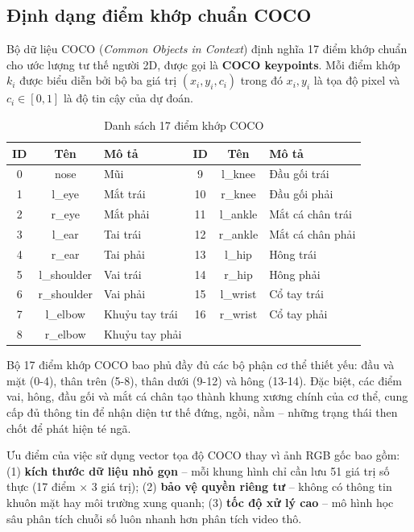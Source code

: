 \subsection{Định dạng điểm khớp chuẩn COCO}
\label{sec:coco_keypoints}

Bộ dữ liệu COCO (\textit{Common Objects in Context}) định nghĩa 17 điểm khớp chuẩn cho ước lượng tư thế người 2D, được gọi là \textbf{COCO keypoints}. Mỗi điểm khớp $k_i$ được biểu diễn bởi bộ ba giá trị $(x_i, y_i, c_i)$ trong đó $x_i, y_i$ là tọa độ pixel và $c_i \in [0, 1]$ là độ tin cậy của dự đoán.

\begin{table}[h]
\centering
\caption{Danh sách 17 điểm khớp COCO}
\label{tab:coco_keypoints}
\begin{tabular}{|c|c|l|c|c|l|}
\hline
\textbf{ID} & \textbf{Tên} & \textbf{Mô tả} & \textbf{ID} & \textbf{Tên} & \textbf{Mô tả} \\
\hline
0 & nose & Mũi & 9 & l\_knee & Đầu gối trái \\
1 & l\_eye & Mắt trái & 10 & r\_knee & Đầu gối phải \\
2 & r\_eye & Mắt phải & 11 & l\_ankle & Mắt cá chân trái \\
3 & l\_ear & Tai trái & 12 & r\_ankle & Mắt cá chân phải \\
4 & r\_ear & Tai phải & 13 & l\_hip & Hông trái \\
5 & l\_shoulder & Vai trái & 14 & r\_hip & Hông phải \\
6 & r\_shoulder & Vai phải & 15 & l\_wrist & Cổ tay trái \\
7 & l\_elbow & Khuỷu tay trái & 16 & r\_wrist & Cổ tay phải \\
8 & r\_elbow & Khuỷu tay phải & \multicolumn{3}{c|}{} \\
\hline
\end{tabular}
\end{table}

Bộ 17 điểm khớp COCO bao phủ đầy đủ các bộ phận cơ thể thiết yếu: đầu và mặt (0-4), thân trên (5-8), thân dưới (9-12) và hông (13-14). Đặc biệt, các điểm vai, hông, đầu gối và mắt cá chân tạo thành khung xương chính của cơ thể, cung cấp đủ thông tin để nhận diện tư thế đứng, ngồi, nằm -- những trạng thái then chốt để phát hiện té ngã.

Ưu điểm của việc sử dụng vector tọa độ COCO thay vì ảnh RGB gốc bao gồm: (1) \textbf{kích thước dữ liệu nhỏ gọn} -- mỗi khung hình chỉ cần lưu 51 giá trị số thực (17 điểm $\times$ 3 giá trị); (2) \textbf{bảo vệ quyền riêng tư} -- không có thông tin khuôn mặt hay môi trường xung quanh; (3) \textbf{tốc độ xử lý cao} -- mô hình học sâu phân tích chuỗi số luôn nhanh hơn phân tích video thô.

